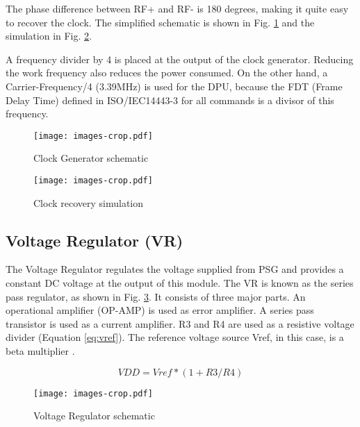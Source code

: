 The phase difference between RF+ and RF- is 180 degrees, making it quite easy to recover the clock. The simplified schematic is shown in Fig. \ref{fig:clk} and the simulation in Fig. \ref{fig:clk_sim}.

A frequency divider by 4 is placed at the output of the clock generator. Reducing the work frequency also reduces the power consumed. On the other hand, a Carrier-Frequency/4 (3.39MHz) is used for the DPU, because the FDT (Frame Delay Time) defined in ISO/IEC14443-3 for all commands is a divisor of this frequency.
 

\begin{figure}[]
  \centering
  \texttt{[image: images-crop.pdf]}
  \caption{Clock Generator schematic}
  \label{fig:clk}
\end{figure}

\begin{figure}[h]
  \centering
  \texttt{[image: images-crop.pdf]}
  \caption{Clock recovery simulation}
  \label{fig:clk_sim}
\end{figure}


\subsection{Voltage Regulator (VR)}

The Voltage Regulator \cite{rfid_ldo} regulates the voltage supplied from PSG and provides a constant DC voltage at the output of this module. The VR is known as the series pass regulator, as shown in Fig. \ref{fig:ldo}. It consists of three major parts. An operational amplifier (OP-AMP) is used as error amplifier. A series pass transistor is used as a current amplifier. R3 and R4 are used as a resistive voltage divider (Equation \ref{eq:vref}). The reference voltage source Vref, in this case, is a beta multiplier \cite{panadero}. 

\begin{equation} \label{eq:vref}
VDD = Vref*(1+R3/R4)
\end{equation}


\begin{figure}[]
  \centering
  \texttt{[image: images-crop.pdf]}
  \caption{Voltage Regulator schematic}
  \label{fig:ldo}
\end{figure}


